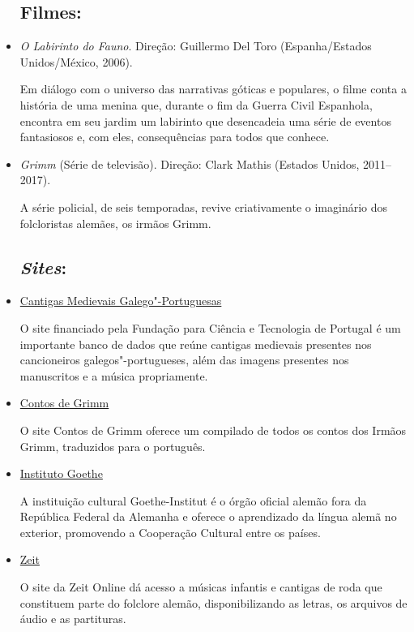 \documentclass[12pt]{extarticle}
\begin{document}
\begin{itemize}

\subsection{Filmes:}

\item \textit{O Labirinto do Fauno}. Direção: Guillermo Del Toro (Espanha/Estados Unidos/México, 2006).

Em diálogo com o universo das narrativas góticas e populares, o filme conta a história de uma menina 
que, durante o fim da Guerra Civil Espanhola, encontra em seu jardim um labirinto que desencadeia 
uma série de eventos fantasiosos e, com eles, consequências para todos que conhece.

\item \textit{Grimm} (Série de televisão). Direção: Clark Mathis (Estados Unidos, 2011--2017).

A série policial, de seis temporadas, revive criativamente o imaginário dos folcloristas alemães, 
os irmãos Grimm.

\subsection{\emph{Sites}:}


\item \href{https://cantigas.fcsh.unl.pt/index.asp}{Cantigas Medievais Galego"-Portuguesas}

O site financiado pela Fundação para Ciência e Tecnologia de Portugal é um importante banco de dados
que reúne cantigas medievais presentes nos cancioneiros galegos"-portugueses, além das imagens presentes 
nos manuscritos e a música propriamente.

\item \href{https://www.grimmstories.com/pt/grimm_contos/index}{Contos de Grimm}

O site Contos de Grimm oferece um compilado de todos os contos dos Irmãos Grimm, traduzidos para o português.

\item \href{http://www.goethe.de/rio}{Instituto Goethe}

A instituição cultural Goethe-Institut é o órgão oficial alemão fora da República Federal da Alemanha e 
oferece o aprendizado da língua alemã no exterior, promovendo a Cooperação Cultural entre os países.

\item \href{https://www.zeit.de/serie/kinderlieder?fbclid=IwAR0YTdmrrM24sDcmak__AxviJPibv0_Bxf9sx9XkX7g-4VxcKbNbRbVPrew&utm_referrer=https%3A%2F%2Fl.facebook.com%2F}{Zeit}

O site da Zeit Online dá acesso a músicas infantis e cantigas de roda que constituem parte do folclore alemão, 
disponibilizando as letras, os arquivos de áudio e as partituras.

\end{itemize}
\end{document}
